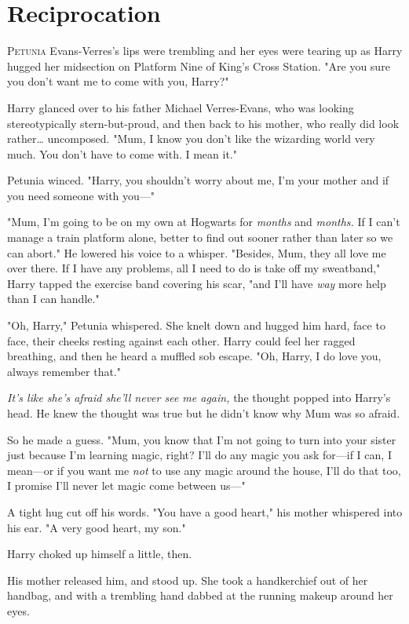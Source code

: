\chapter{Reciprocation}

\lettrine{P}{etunia} Evans-Verres's lips were trembling and her eyes were tearing up as
Harry hugged her midsection on Platform Nine of King's Cross Station. "Are
you sure you don't want me to come with you, Harry?"

Harry glanced over to his father Michael Verres-Evans, who was looking
stereotypically stern-but-proud, and then back to his mother, who really did
look rather{\ldots} uncomposed. "Mum, I know you don't like the wizarding world
very much. You don't have to come with. I mean it."

Petunia winced. "Harry, you shouldn't worry about me, I'm your mother and if
you need someone with you---"

"Mum, I'm going to be on my own at Hogwarts for \emph{months} and
\emph{months.} If I can't manage a train platform alone, better to find out
sooner rather than later so we can abort." He lowered his voice to a whisper.
"Besides, Mum, they all love me over there. If I have any problems, all I need
to do is take off my sweatband," Harry tapped the exercise band covering his
scar, "and I'll have \emph{way} more help than I can handle."

"Oh, Harry," Petunia whispered. She knelt down and hugged him hard, face to
face, their cheeks resting against each other. Harry could feel her ragged
breathing, and then he heard a muffled sob escape. "Oh, Harry, I do love you,
always remember that."

\emph{It's like she's afraid she'll never see me again,} the thought popped
into Harry's head. He knew the thought was true but he didn't know why Mum was
so afraid.

So he made a guess. "Mum, you know that I'm not going to turn into your sister
just because I'm learning magic, right? I'll do any magic you ask for---if I
can, I mean---or if you want me \emph{not} to use any magic around the house,
I'll do that too, I promise I'll never let magic come between us---"

A tight hug cut off his words. "You have a good heart," his mother whispered
into his ear. "A very good heart, my son."

Harry choked up himself a little, then.

His mother released him, and stood up. She took a handkerchief out of her
handbag, and with a trembling hand dabbed at the running makeup around her eyes.

